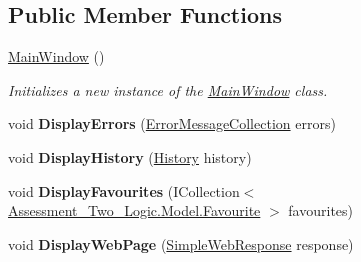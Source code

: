 \subsection*{Public Member Functions}
\begin{DoxyCompactItemize}
\item 
\hyperlink{class_assessment___two_1_1_main_window_a25be9d255cede4eb1a2164030f84908c}{MainWindow} ()
\begin{DoxyCompactList}\small\item\em Initializes a new instance of the \hyperlink{class_assessment___two_1_1_main_window}{MainWindow} class. \item\end{DoxyCompactList}\item 
\hypertarget{class_assessment___two_1_1_main_window_a23233a517c8f41482a9a8d7415fa23de}{
void {\bfseries DisplayErrors} (\hyperlink{class_assessment___two___logic_1_1_model_1_1_error_message_collection}{ErrorMessageCollection} errors)}
\label{class_assessment___two_1_1_main_window_a23233a517c8f41482a9a8d7415fa23de}

\item 
\hypertarget{class_assessment___two_1_1_main_window_a0d2ba421e13612000947b8e88cb0d1aa}{
void {\bfseries DisplayHistory} (\hyperlink{class_assessment___two___logic_1_1_model_1_1_history}{History} history)}
\label{class_assessment___two_1_1_main_window_a0d2ba421e13612000947b8e88cb0d1aa}

\item 
\hypertarget{class_assessment___two_1_1_main_window_ad9c93a3f0daed8c5d545320e2ee410a1}{
void {\bfseries DisplayFavourites} (ICollection$<$ \hyperlink{class_assessment___two___logic_1_1_model_1_1_favourite}{Assessment\_\-Two\_\-Logic.Model.Favourite} $>$ favourites)}
\label{class_assessment___two_1_1_main_window_ad9c93a3f0daed8c5d545320e2ee410a1}

\item 
\hypertarget{class_assessment___two_1_1_main_window_ae4b183d4d555c184bece350081fde473}{
void {\bfseries DisplayWebPage} (\hyperlink{class_assessment___two___logic_1_1_model_1_1_simple_web_response}{SimpleWebResponse} response)}
\label{class_assessment___two_1_1_main_window_ae4b183d4d555c184bece350081fde473}

\end{DoxyCompactItemize}
